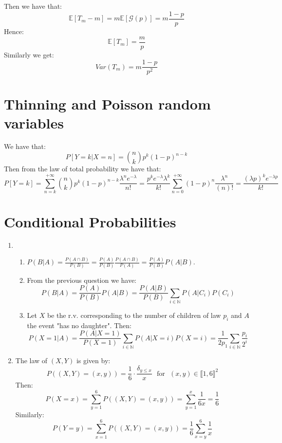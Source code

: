 \documentclass[10pt,a4paper]{book}
\begin{document}
\subsection{}
Then we have that:
\[
\mathbb{E}[T_m - m] = m \mathbb{E}[\mathcal{G}(p)] = m\frac{1-p}{p}
\]
Hence:
\[
\mathbb{E}[T_m] = \frac{m}{p}
\]
Similarly we get:
\[
Var(T_m) = m \frac{1 - p}{p^2}
\]

\section{Thinning and Poisson random variables}

We have that:
\[
P[Y = k | X = n] = \binom{n}{k} p^k (1 - p)^{n - k}
\]
Then from the law of total probability we have that:
\[
P[Y = k] = \sum_{n = k}^{+\infty} \binom{n}{k} p^k (1 - p)^{n - k} \frac{\lambda^n e^{-\lambda}}{n!} = \frac{p^k e^{- \lambda} \lambda^k}{k!} \sum_{n = 0}^{+\infty} (1 - p)^n \frac{\lambda^{n}}{(n)!} = \frac{(\lambda p)^k  e^{- \lambda p}}{k!}
\]

\section{Conditional Probabilities}

\begin{enumerate}

\item \begin{enumerate}

\item $P(B|A) = \frac{P(A \cap B)}{P(B)} = \frac{P(A)}{P(B)} \frac{P(A \cap B)}{P(A)} = \frac{P(A)}{P(B)} P(A | B)$. 

\item From the previous question we have: 
\[
P(B | A) = \frac{P(A)}{P(B)} P(A | B) = \frac{P(A | B)}{P(B)} \sum_{i \in \mathbb{N}} P(A | C_i) P(C_i)
\]

\item Let $X$ be the r.v. corresponding to the number of children of law $p_i$ and $A$ the event "has no daughter". Then:
\[
P(X = 1 | A) = \frac{P(A | X = 1)}{P(X = 1)} \sum_{i \in \mathbb{N}} P(A | X = i) P(X = i) = \frac{1}{2 p_1} \sum_{i \in \mathbb{N}} \frac{p_i}{2^i} 
\]

\end{enumerate}

\item The law of $(X, Y)$ is given by:
\[
P((X, Y) = (x, y)) = \frac{1}{6} \cdot \frac{\delta_{y \leqslant x}}{x} \mbox{~~for~~} (x, y) \in \llbracket 1, 6 \rrbracket^2
\]
Then:
\[
P(X = x) = \sum_{y = 1}^6 P((X, Y) = (x, y)) = \sum_{y= 1}^x \frac{1}{6x} = \frac{1}{6}
\]
Similarly:
\[
P(Y = y) = \sum_{x = 1}^6 P((X, Y) = (x, y)) = \frac{1}{6} \sum_{x=y}^6 \frac{1}{x}
\]

\end{enumerate}
\end{document}
